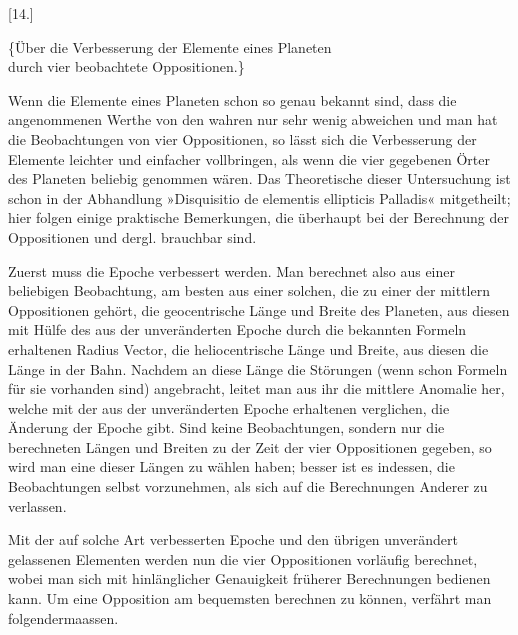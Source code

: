 \begin{center}
[14.]
\end{center}
\begin{center}
\{Über die Verbesserung der Elemente eines Planeten\\
durch vier beobachtete Oppositionen.\}
\end{center}
Wenn die Elemente eines Planeten schon so genau bekannt sind, dass die
angenommenen Werthe von den wahren nur sehr wenig abweichen und man hat die
Beobachtungen von vier Oppositionen, so lässt sich die Verbesserung der
Elemente leichter und einfacher vollbringen, als wenn die vier gegebenen
Örter des Planeten beliebig genommen wären. Das Theoretische dieser
Untersuchung ist schon in der Abhandlung »Disquisitio de elementis ellipticis
Palladis« mitgetheilt; hier folgen einige praktische Bemerkungen, die überhaupt
bei der Berechnung der Oppositionen und dergl. brauchbar sind.

Zuerst muss die Epoche verbessert werden. Man berechnet also aus einer
beliebigen Beobachtung, am besten aus einer solchen, die zu einer der mittlern
Oppositionen gehört, die geocentrische Länge und Breite des Planeten, aus
diesen mit Hülfe des aus der unveränderten Epoche durch die bekannten Formeln
erhaltenen Radius Vector, die heliocentrische Länge und Breite, aus diesen die
Länge in der Bahn. Nachdem an diese Länge die Störungen (wenn schon Formeln
für sie vorhanden sind) angebracht, leitet man aus ihr die mittlere Anomalie
her, welche mit der aus der unveränderten Epoche erhaltenen verglichen, die
Änderung der Epoche gibt. Sind keine Beobachtungen, sondern nur die
berechneten Längen und Breiten zu der Zeit der vier Oppositionen gegeben, so
wird man eine dieser Längen zu wählen haben; besser ist es indessen, die
Beobachtungen selbst vorzunehmen, als sich auf die Berechnungen Anderer zu
verlassen.

Mit der auf solche Art verbesserten Epoche und den übrigen unverändert
gelassenen Elementen werden nun die vier Oppositionen vorläufig berechnet,
wobei man sich mit hinlänglicher Genauigkeit früherer Berechnungen bedienen
kann. Um eine Opposition am bequemsten berechnen zu können, verfährt man
folgendermaassen.

